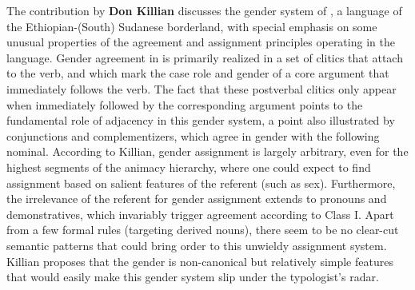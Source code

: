 \documentclass[output=collectionpaper]{langsci/langscibook}
\begin{document}
The contribution by \textbf{Don Killian} discusses the gender system of , a  language of the Ethiopian-(South) Sudanese borderland, with special emphasis on some unusual properties of the agreement and assignment principles operating in the language. Gender agreement in  is primarily realized in a set of clitics that attach to the verb, and which mark the case role and gender of a core argument that immediately follows the verb. The fact that these postverbal clitics only appear when immediately followed by the corresponding argument points to the fundamental role of adjacency in this gender system, a point also illustrated by conjunctions and complementizers, which agree in gender with the following nominal. According to Killian, gender assignment is largely arbitrary, even for the highest segments of the animacy hierarchy, where one could expect to find assignment based on salient features of the referent (such as sex). Furthermore, the irrelevance of the referent for gender assignment extends to pronouns and demonstratives, which invariably trigger agreement according to Class I. Apart from a few formal rules (targeting derived nouns), there seem to be no clear-cut semantic patterns that could bring order to this unwieldy assignment system. Killian proposes that the  gender is non-canonical but relatively simple \textendash{} features that would easily make this gender system slip under the typologist’s radar.
\end{document}
